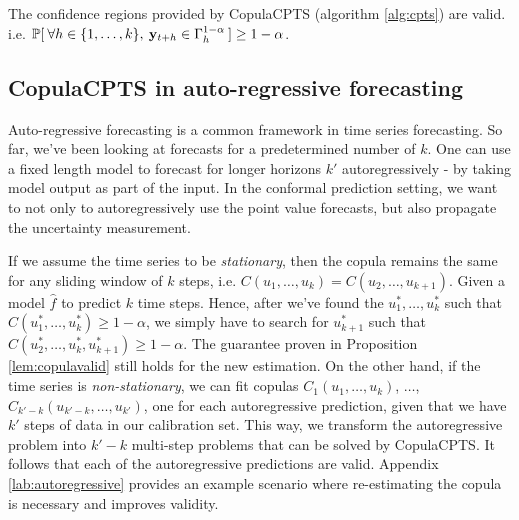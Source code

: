 \begin{proposition}
The confidence regions provided by CopulaCPTS (algorithm \ref{alg:cpts}) are valid. i.e. $ {\mathbb{P}}[\: \forall h \in \{1,\ldots, k\}, \: \mathbf{y}_{t+h} \in \Gamma^{1-\alpha}_h\: ] \geq 1-\alpha$.
\label{lem:copulavalid}
\end{proposition}


\subsection{CopulaCPTS in  auto-regressive forecasting }
Auto-regressive forecasting is a common framework in time series forecasting. So far, we've been looking at forecasts for a predetermined number of  $k$. One can use a fixed length model to forecast for longer horizons $k'$ autoregressively - by taking model output as part of the input. In the conformal prediction setting, we want to not only to autoregressively use the point value forecasts, but also propagate the uncertainty measurement. 

If we assume the time series to be \textit{stationary}, then the copula remains the same for any sliding window of $k$ steps, i.e. $C(u_1, \ldots, u_k) = C(u_2, \ldots, u_{k+1})$. Given a model $\hat{f}$ to predict $k$ time steps. Hence, after we've found the $u_1^*, \ldots, u_k^*$ such that $C(u_1^*, \ldots, u_k^*) \geq 1-\alpha$, we simply have to search for $u_{k+1}^*$ such that $C(u_2^*, \ldots, u_k^*, u_{k+1}^*) \geq 1-\alpha$. The guarantee proven in Proposition \ref{lem:copulavalid} still holds for the new estimation. On the other hand, if the time series is \textit{non-stationary}, we can fit copulas $C_1(u_1, \ldots, u_k)$, $\ldots$, $C_{k'-k}(u_{k'-k}, \ldots, u_{k'})$, one for each autoregressive prediction, given that we have $k'$ steps of data in our calibration set. This way, we transform the autoregressive problem into $k'-k$ multi-step problems that can be solved by CopulaCPTS. It follows that each of the autoregressive predictions are valid. Appendix \ref{lab:autoregressive} provides an example scenario where re-estimating the copula is necessary and improves validity.